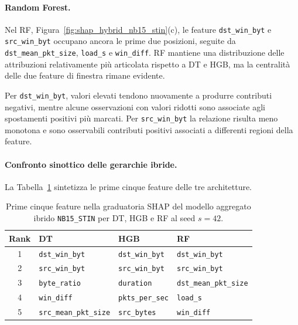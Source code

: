 \paragraph{Random Forest.}
Nel RF, Figura~\ref{fig:shap_hybrid_nb15_stin}(c), le feature \texttt{dst\_win\_byt} e \texttt{src\_win\_byt} occupano ancora le prime due posizioni, seguite da \texttt{dst\_mean\_pkt\_size}, \texttt{load\_s} e \texttt{win\_diff}. 
RF mantiene una distribuzione delle attribuzioni relativamente più articolata rispetto a DT e HGB, ma la centralità delle due feature di finestra rimane evidente.

Per \texttt{dst\_win\_byt}, valori elevati tendono nuovamente a produrre contributi negativi, mentre alcune osservazioni con valori ridotti sono associate agli spostamenti positivi più marcati. 
Per \texttt{src\_win\_byt} la relazione risulta meno monotona e sono osservabili contributi positivi associati a differenti regioni della feature.

\paragraph{Confronto sinottico delle gerarchie ibride.}
La Tabella~\ref{tab:ibridi_shap_top5} sintetizza le prime cinque feature delle tre architetture.

\begin{table}[H]
    \centering
    \small
    \caption[Prime cinque feature nella graduatoria SHAP del modello aggregato ibrido \newline \texttt{NB15\_STIN} per DT, HGB e RF al seed $s=42$.]{Prime cinque feature nella graduatoria SHAP del modello aggregato ibrido \texttt{NB15\_STIN} per DT, HGB e RF al seed $s=42$.}
    \label{tab:ibridi_shap_top5}
    \begin{tabular}{c|lll}
        \toprule
        \textbf{Rank} & \textbf{DT} & \textbf{HGB} & \textbf{RF} \\
        \midrule
        1 & \texttt{dst\_win\_byt} & \texttt{dst\_win\_byt} & \texttt{dst\_win\_byt} \\
        2 & \texttt{src\_win\_byt} & \texttt{src\_win\_byt} & \texttt{src\_win\_byt} \\
        3 & \texttt{byte\_ratio} & \texttt{duration} & \texttt{dst\_mean\_pkt\_size} \\
        4 & \texttt{win\_diff} & \texttt{pkts\_per\_sec} & \texttt{load\_s} \\
        5 & \texttt{src\_mean\_pkt\_size} & \texttt{src\_bytes} & \texttt{win\_diff} \\
        \bottomrule
    \end{tabular}
\end{table}

